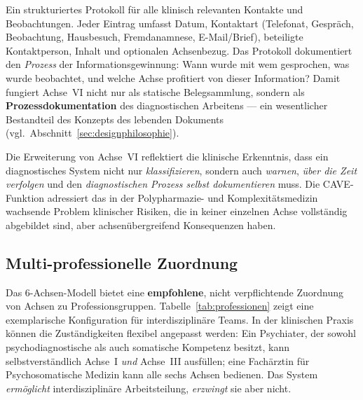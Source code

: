 \documentclass[11pt,a4paper]{article}
\begin{document}
\begin{description}[style=nextline, leftmargin=1.5cm, font=\bfseries]
\item[Kontakt- und Beobachtungsprotokoll] Ein strukturiertes Protokoll f\"ur alle klinisch relevanten Kontakte und Beobachtungen. Jeder Eintrag umfasst Datum, Kontaktart (Telefonat, Gespr\"ach, Beobachtung, Hausbesuch, Fremdanamnese, E-Mail/Brief), beteiligte Kontaktperson, Inhalt und optionalen Achsenbezug. Das Protokoll dokumentiert den \textit{Prozess} der Informationsgewinnung: Wann wurde mit wem gesprochen, was wurde beobachtet, und welche Achse profitiert von dieser Information? Damit fungiert Achse~VI nicht nur als statische Belegsammlung, sondern als \textbf{Prozessdokumentation} des diagnostischen Arbeitens --- ein wesentlicher Bestandteil des Konzepts des lebenden Dokuments (vgl.\ Abschnitt~\ref{sec:designphilosophie}).
\end{description}

Die Erweiterung von Achse~VI reflektiert die klinische Erkenntnis, dass ein diagnostisches System nicht nur \textit{klassifizieren}, sondern auch \textit{warnen}, \textit{\"uber die Zeit verfolgen} und den \textit{diagnostischen Prozess selbst dokumentieren} muss. Die CAVE-Funktion adressiert das in der Polypharmazie- und Komplexit\"atsmedizin wachsende Problem klinischer Risiken, die in keiner einzelnen Achse vollst\"andig abgebildet sind, aber achsen\"ubergreifend Konsequenzen haben.

\subsection{Multi-professionelle Zuordnung}
\label{sec:multiprofessionell}

Das 6-Achsen-Modell bietet eine \textbf{empfohlene}, nicht verpflichtende Zuordnung von Achsen zu Professionsgruppen. Tabelle~\ref{tab:professionen} zeigt eine exemplarische Konfiguration f\"ur interdisziplin\"are Teams. In der klinischen Praxis k\"onnen die Zust\"andigkeiten flexibel angepasst werden: Ein Psychiater, der sowohl psychodiagnostische als auch somatische Kompetenz besitzt, kann selbstverst\"andlich Achse~I \textit{und} Achse~III ausf\"ullen; eine Fach\"arztin f\"ur Psychosomatische Medizin kann alle sechs Achsen bedienen. Das System \textit{erm\"oglicht} interdisziplin\"are Arbeitsteilung, \textit{erzwingt} sie aber nicht.
\end{document}
